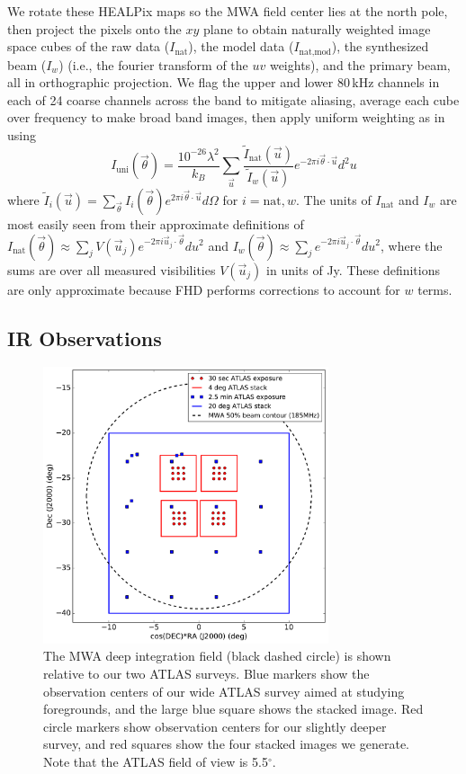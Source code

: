 \documentclass[numberedappendix]{emulateapj}
\begin{document}
We rotate these HEALPix maps so the MWA field center lies at the north pole, then project the pixels onto the $xy$ plane to obtain naturally weighted image space cubes of the raw data ($I_\text{nat}$), the model data ($I_\text{nat,mod}$), the synthesized beam ($I_w$) (i.e., the fourier transform of the $uv$ weights), and the primary beam, all in orthographic projection. We flag the upper and lower 80\,kHz channels in each of 24 coarse channels across the band to mitigate aliasing, average each cube over frequency to make broad band images, then apply uniform weighting as in \citet{dillonneben} using
\begin{equation}
\label{eqn:uniformweighting}
I_\text{uni}(\vec{\theta}) = \frac{10^{-26}\lambda^2}{k_B } \sum_{\vec{u}} \frac{\tilde{I}_\text{nat}(\vec{u})}{\tilde{I}_w(\vec{u})} e^{-2\pi i \vec{\theta}\cdot\vec{u}}d^2u
\end{equation}
where $\tilde{I}_i(\vec{u}) = \sum_{\vec{\theta}} I_i(\vec{\theta}) e^{2\pi i\vec{\theta}\cdot\vec{u}} d\Omega$ for $i=\text{nat},w$. The units of $I_\text{nat}$ and $I_w$ are most easily seen from their approximate definitions of $I_\text{nat}(\vec{\theta})\approx\sum_j V(\vec{u}_j)e^{-2\pi i\vec{u}_j\cdot\vec{\theta}}du^2$ and $I_w(\vec{\theta})\approx\sum_j e^{-2\pi i\vec{u}_j\cdot\vec{\theta}}du^2$, where the sums are over all measured visibilities $V(\vec{u}_j)$ in units of Jy. These definitions are only approximate because FHD performs corrections to account for $w$ terms.

\subsection{IR Observations}

\begin{figure}[h]
\centering
\includegraphics[width=3.3in]{chap5_xcor/survey_overview.pdf}
\caption{The MWA deep integration field (black dashed circle) is shown relative to our two ATLAS surveys. Blue markers show the observation centers of our wide ATLAS survey aimed at studying foregrounds, and the large blue square shows the stacked image. Red circle markers show observation centers for our slightly deeper survey, and red squares show the four stacked images we generate. Note that the ATLAS field of view is 5.5$^\circ$.}
\label{fig:surveyoverview}
\end{figure}
\end{document}
